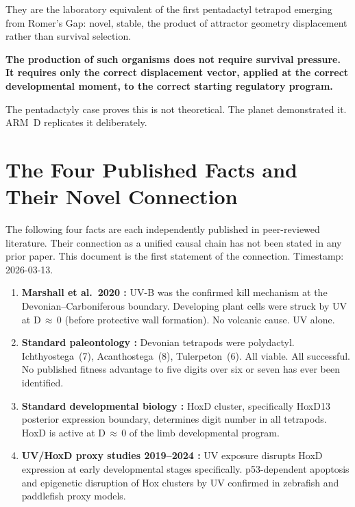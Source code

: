 \documentclass[11pt, a4paper]{article}
\begin{document}
They are the laboratory equivalent of the first
pentadactyl tetrapod emerging from Romer's Gap:
novel, stable, the product of attractor geometry
displacement rather than survival selection.

\textbf{The production of such organisms does not
require survival pressure. It requires only the
correct displacement vector, applied at the correct
developmental moment, to the correct starting
regulatory program.}

The pentadactyly case proves this is not
theoretical.
The planet demonstrated it.
ARM~D replicates it deliberately.

\section{The Four Published Facts and Their
Novel Connection}

The following four facts are each independently
published in peer-reviewed literature.
Their connection as a unified causal chain has
not been stated in any prior paper.
This document is the first statement of the
connection.
Timestamp: 2026-03-13.

\begin{enumerate}[leftmargin=*, label=\textbf{Fact \arabic*:}]
\item \textbf{Marshall et al.\ 2020
  \cite{marshall2020}:}
  UV-B was the confirmed kill mechanism at the
  Devonian--Carboniferous boundary.
  Developing plant cells were struck by UV at
  D\,$\approx$\,0 (before protective wall
  formation).
  No volcanic cause. UV alone.

\item \textbf{Standard paleontology
  \cite{clack2012}:}
  Devonian tetrapods were polydactyl.
  Ichthyostega~(7), Acanthostega~(8),
  Tulerpeton~(6). All viable. All successful.
  No published fitness advantage to five digits
  over six or seven has ever been identified.

\item \textbf{Standard developmental biology
  \cite{zakany2007}:}
  HoxD cluster, specifically HoxD13 posterior
  expression boundary, determines digit number
  in all tetrapods.
  HoxD is active at D\,$\approx$\,0 of the
  limb developmental program.

\item \textbf{UV/HoxD proxy studies 2019--2024
  \cite{hoxduv2022}:}
  UV exposure disrupts HoxD expression at early
  developmental stages specifically.
  p53-dependent apoptosis and epigenetic disruption
  of Hox clusters by UV confirmed in zebrafish
  and paddlefish proxy models.
\end{enumerate}
\end{document}

